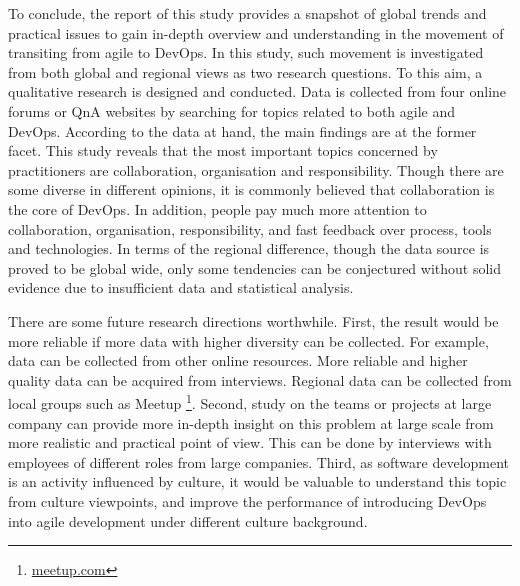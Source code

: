 \documentclass[
  12pt,
  a4paper,
]{article}
\begin{document}
To conclude, the report of this study provides a snapshot of global
trends and practical issues to gain in-depth overview and understanding
in the movement of transiting from agile to DevOps. In this study, such
movement is investigated from both global and regional views as two
research questions. To this aim, a qualitative research is designed and
conducted. Data is collected from four online forums or QnA websites by
searching for topics related to both agile and DevOps. According to the
data at hand, the main findings are at the former facet. This study
reveals that the most important topics concerned by practitioners are
collaboration, organisation and responsibility. Though there are some
diverse in different opinions, it is commonly believed that
collaboration is the core of DevOps. In addition, people pay much more
attention to collaboration, organisation, responsibility, and fast
feedback over process, tools and technologies. In terms of the regional
difference, though the data source is proved to be global wide, only
some tendencies can be conjectured without solid evidence due to
insufficient data and statistical analysis.

There are some future research directions worthwhile. First, the result
would be more reliable if more data with higher diversity can be
collected. For example, data can be collected from other online
resources. More reliable and higher quality data can be acquired from
interviews. Regional data can be collected from local groups such as
Meetup \footnote{\url{meetup.com}}. Second, study on the teams or
projects at large company can provide more in-depth insight on this
problem at large scale from more realistic and practical point of view.
This can be done by interviews with employees of different roles from
large companies. Third, as software development is an activity
influenced by culture, it would be valuable to understand this topic
from culture viewpoints, and improve the performance of introducing
DevOps into agile development under different culture background.

\pagebreak

  
\end{document}
